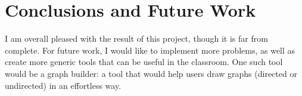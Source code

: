 \chapter{Conclusions and Future Work}
I am overall pleased with the result of this project, though it is far from complete. 
For future work, I would like to implement more problems, as well as create 
more generic tools that can be useful in the classroom. 
One such tool would be a graph builder: a tool that would help users draw 
graphs (directed or undirected) in an effortless way. 
\newline\newline

